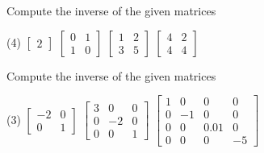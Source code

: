 \begin{exercise}\ansMark%
Compute the inverse of the given matrices
\begin{tasks}(4)
\task
$\begin{bmatrix}
2
\end{bmatrix}$
\task
$\begin{bmatrix}
0 & 1 \\
1 & 0
\end{bmatrix}$
\task
$\begin{bmatrix}
1 & 2 \\
3 & 5
\end{bmatrix}$
\task
$\begin{bmatrix}
4 & 2 \\
4 & 4
\end{bmatrix}$
\end{tasks}
\end{exercise}

\begin{exercise}
Compute the inverse of the given matrices
\begin{tasks}(3)
\task
$\begin{bmatrix}
-2 & 0 \\
0 & 1 
\end{bmatrix}$
\task
$\begin{bmatrix}
3 & 0 & 0 \\
0 & -2 & 0 \\ 
0 & 0 & 1
\end{bmatrix}$
\task
$\begin{bmatrix}
1 & 0 & 0 & 0 \\
0 & -1 & 0 & 0 \\ 
0 & 0 & 0.01 & 0 \\
0 & 0 & 0 & -5
\end{bmatrix}$
\end{tasks}
\end{exercise}

